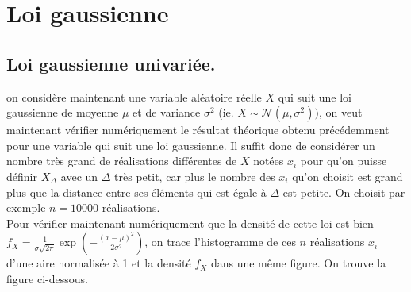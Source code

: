 \documentclass[a4paper]{article}
\begin{document}
\newpage

\section{Loi gaussienne}
\subsection{Loi gaussienne univariée.}
on considère maintenant une variable aléatoire réelle $X$ qui suit une loi gaussienne de moyenne $\mu$ et de variance $\sigma^{2}$ (ie. $X \sim \mathcal{N}(\mu, \sigma^{2}))$, on veut maintenant vérifier numériquement le résultat théorique obtenu précédemment pour une variable qui suit une loi gaussienne. Il suffit donc de considérer un nombre très grand de réalisations différentes de $X$ notées $x_i$ pour qu'on puisse définir $X_{\Delta}$ avec un $\Delta$ très petit, car plus le nombre des $x_i$ qu'on choisit est grand plus que la distance entre ses éléments qui est égale à $\Delta$ est petite. On choisit par exemple $n=10000$ réalisations.\\
Pour vérifier maintenant numériquement que la densité de cette loi est bien $f_{X}=\frac{1}{\sigma\sqrt{2\pi}}\exp\left(-\frac{(x-\mu)^{2}}{2\sigma^2}\right)$, on trace l'histogramme de ces $n$ réalisations $x_{i}$ d'une aire normalisée à 1 et la densité $f_{X}$ dans une même figure. On trouve la figure ci-dessous.
\end{document}
